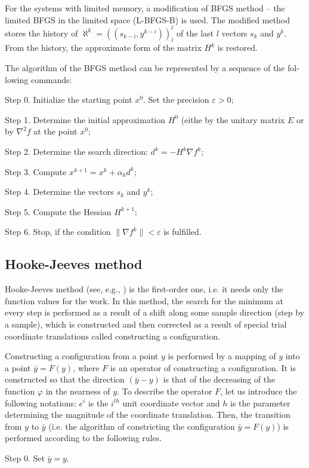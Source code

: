 \documentclass[runningheads]{llncs}
\begin{document}
For the systems with limited memory, a modification of BFGS method – the limited BFGS in the limited space (L-BFGS-B) is used. The modified method stores the history of $\aleph^k = ((s_{k-i}, y^{k-i}))_i^l$ of the last $l$ vectors $s_k$ and $y^k$. From the history, the approximate form of the matrix $H^k$ is restored.

The algorithm of the BFGS method can be represented by a sequence of the fol-lowing commands:

Step 0. Initialize the starting point $x^0$. Set the precision $\varepsilon > 0$;

Step 1. Determine the initial approximation $H^0$ (eithe by the unitary matrix $E$ or by $\nabla^2 f$ at the point $x^0$;

Step 2. Determine the search direction: $d^k = -H^k \nabla f^k$;

Step 3. Compute $x^{k+1} = x^k + \alpha_k d^k$;

Step 4. Determine the vectors $s_k$ and $y^k$;

Step 5. Compute the Hessian $H^{k+1}$;

Step 6. Stop, if the condition $\|\nabla f^k\| < \varepsilon$ is fulfilled.

\subsection{Hooke-Jeeves method}
Hooke-Jeeves method (see, e.g., \cite{Himmelblau}) is the first-order one, i.e. it needs only the function values for the work. In this method, the search for the minimum at every step is performed as a result of a shift along some sample direction (step by a sample), which is constructed and then corrected as a result of special trial coordinate translations called constructing a configuration.

Constructing a configuration from a point $y$ is performed by a mapping of $y$ into a point $\bar{y} = F(y)$, where $F$ is an operator of constructing a configuration. It is constructed so that the direction $(\bar{y} - y)$ is that of the decreasing of the function $\varphi$ in the nearness of $y$. To describe the operator $F$, let us introduce the following notations: $e^i$ is the $i^{th}$ unit coordinate vector and $h$ is the parameter determining the magnitude of the coordinate translation. Then, the transition from $y$ to $\bar{y}$ (i.e. the algorithm of constricting the configuration $\bar{y} = F(y)$) is performed according to the following rules.

Step 0. Set $\bar{y} = y$.
\end{document}
